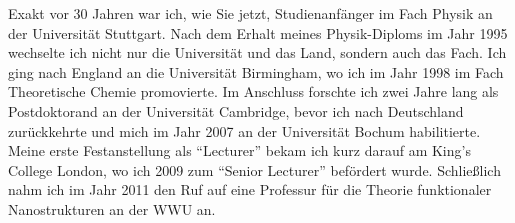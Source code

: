 \begin{multicols}{2}
Exakt vor 30 Jahren war ich, wie Sie jetzt, Studienanfänger im Fach Physik an der Universität Stuttgart. Nach dem Erhalt meines Physik-Diploms im Jahr 1995 wechselte ich nicht nur die Universität und das Land, sondern auch das Fach. Ich ging nach England an die Universität Birmingham, wo ich im Jahr 1998 im Fach Theoretische Chemie promovierte. Im Anschluss forschte ich zwei Jahre lang als Postdoktorand an der Universität Cambridge, bevor ich nach Deutschland zurückkehrte und mich im Jahr 2007 an der Universität Bochum habilitierte. Meine erste Festanstellung als “Lecturer” bekam ich kurz darauf am King’s College London, wo ich 2009 zum “Senior Lecturer” befördert wurde. Schließlich nahm ich im Jahr 2011 den Ruf auf eine Professur für die Theorie funktionaler Nanostrukturen an der WWU an.  

\end{multicols}

\newpage

